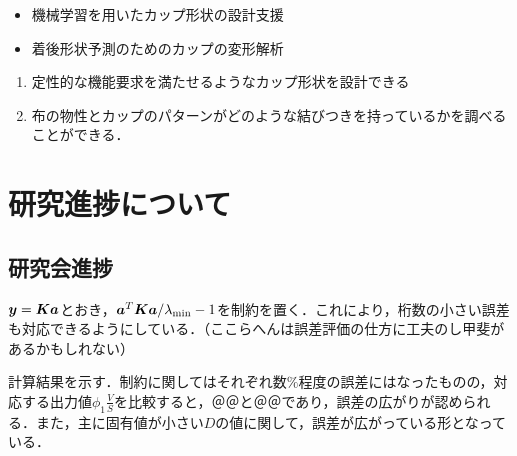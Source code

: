 \documentclass[11pt]{jsarticle}
\begin{document}
	\articleSPRabst
		\begin{itemize}
			\item 機械学習を用いたカップ形状の設計支援
			\item 着後形状予測のためのカップの変形解析
		\end{itemize}
		
		
	\articleSPRobj
		\begin{enumerate}
			\item 定性的な機能要求を満たせるようなカップ形状を設計できる
			\item 布の物性とカップのパターンがどのような結びつきを持っているかを調べることができる．
		\end{enumerate}
	\articleSPRitemsone
		
		\tableofcontents
		
		
	\articleSPRitemstwo
	\renewcommand{\labelitemi}{$\blacktriangledown$}
	\newcommand{\argmax}{\mathop{\rm arg~max}\limits}
	\newcommand{\argmin}{\mathop{\rm arg~min}\limits}
	\newcommand{\Ker}{{\rm Ker}}
	\newcommand{\rank}{{\rm rank}}
	\section{研究進捗について}
		\subsection{研究会進捗}
			$ \boldsymbol{y} = \boldsymbol{K}\boldsymbol{a} $とおき，$ \boldsymbol{a}^T \boldsymbol{K} \boldsymbol{a} / \lambda_{\min} - 1 $を制約を置く．これにより，桁数の小さい誤差も対応できるようにしている．（ここらへんは誤差評価の仕方に工夫のし甲斐があるかもしれない）
			
			計算結果を示す．制約に関してはそれぞれ数$ \% $程度の誤差にはなったものの，対応する出力値$ \phi_1 \frac{V}{S} $を比較すると，＠＠と＠＠であり，誤差の広がりが認められる．また，主に固有値が小さい$ D $の値に関して，誤差が広がっている形となっている．
\end{document}

